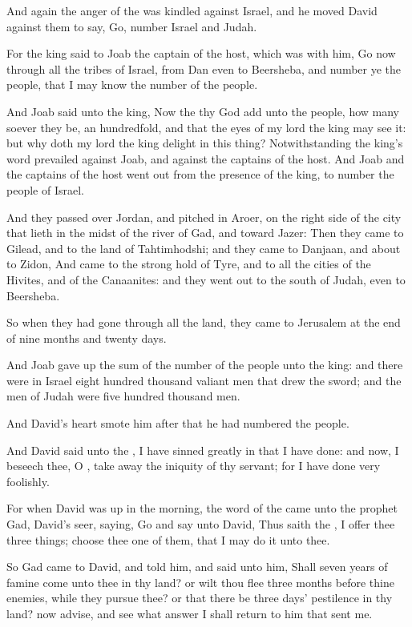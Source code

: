 \Chapter
\Verse And again the anger of the \LORD was kindled against Israel, and he moved David against them to say, Go, number Israel and Judah.

\Verse For the king said to Joab the captain of the host, which was with him, Go now through all the tribes of Israel, from Dan even to Beersheba, and number ye the people, that I may know the number of the people.

\Verse And Joab said unto the king, Now the \LORD thy God add unto the people, how many soever they be, an hundredfold, and that the eyes of my lord the king may see it: but why doth my lord the king delight in this thing?  \Verse Notwithstanding the king's word prevailed against Joab, and against the captains of the host. And Joab and the captains of the host went out from the presence of the king, to number the people of Israel.

\Verse And they passed over Jordan, and pitched in Aroer, on the right side of the city that lieth in the midst of the river of Gad, and toward Jazer: \Verse Then they came to Gilead, and to the land of Tahtimhodshi; and they came to Danjaan, and about to Zidon, \Verse And came to the strong hold of Tyre, and to all the cities of the Hivites, and of the Canaanites: and they went out to the south of Judah, even to Beersheba.

\Verse So when they had gone through all the land, they came to Jerusalem at the end of nine months and twenty days.

\Verse And Joab gave up the sum of the number of the people unto the king: and there were in Israel eight hundred thousand valiant men that drew the sword; and the men of Judah were five hundred thousand men.

\Verse And David's heart smote him after that he had numbered the people.

And David said unto the \LORD, I have sinned greatly in that I have done: and now, I beseech thee, O \LORD, take away the iniquity of thy servant; for I have done very foolishly.

\Verse For when David was up in the morning, the word of the \LORD came unto the prophet Gad, David's seer, saying, \Verse Go and say unto David, Thus saith the \LORD, I offer thee three things; choose thee one of them, that I may do it unto thee.

\Verse So Gad came to David, and told him, and said unto him, Shall seven years of famine come unto thee in thy land? or wilt thou flee three months before thine enemies, while they pursue thee? or that there be three days' pestilence in thy land? now advise, and see what answer I shall return to him that sent me.

